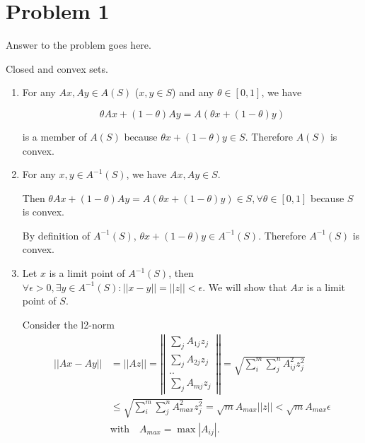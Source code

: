 \documentclass[12pt,letterpaper]{article}
\begin{document}
\section*{Problem 1}

Answer to the problem goes here.

\begin{alphalist}

\item Closed and convex sets.
\begin{enumerate}[label=(\roman*)]
    \item
        For any $Ax, Ay \in A(S)$ ($x, y \in S$) and any $\theta \in [0, 1]$, we have

        \[\theta Ax + (1 - \theta) Ay = A (\theta x + (1- \theta)y)\]

        is a member of $A(S)$ because $\theta x + (1-\theta) y \in S$.
        Therefore $A(S)$ is convex.

    \item
        For any $x, y \in A^{-1}(S)$, we have $Ax, Ay \in S$.

        Then $\theta Ax + (1-\theta)Ay = A(\theta x + (1-\theta)y) \in S,
        \forall \theta \in [0, 1]$ because $S$ is convex.

        By definition of $A^{-1}(S)$, $\theta x + (1-\theta)y \in A^{-1}(S)$. Therefore $A^{-1}(S)$ is convex.

    \item
        Let $x$ is a limit point of $A^{-1}(S)$, then $\forall{}\epsilon{}>0,
        \exists{}y \in A^{-1}(S): ||x - y|| = ||z|| < \epsilon$. We will show
        that $Ax$ is a limit point of $S$.

        Consider the l2-norm
        \[
        \begin{split}
            ||Ax - Ay|| &= ||Az||  = \left|\left|\begin{matrix} \sum_j A_{1j}z_j \\ \sum_j A_{2j}z_j \\ .. \\ \sum_j A_{mj}z_j\end{matrix}\right|\right|
                        = \sqrt{\sum_i^m\sum_j^nA_{ij}^2 z_j^2} \\
                        &\le \sqrt{\sum_i^m \sum_j^n A_{max}^2 z_j^2} =\sqrt{m} A_{max} ||z|| < \sqrt{m}A_{max}\epsilon \\
                        &\text{with} \quad A_{max} = \max{|A_{ij}|}.
        \end{split}
    \]


\end{enumerate}
\end{alphalist}
\end{document}
